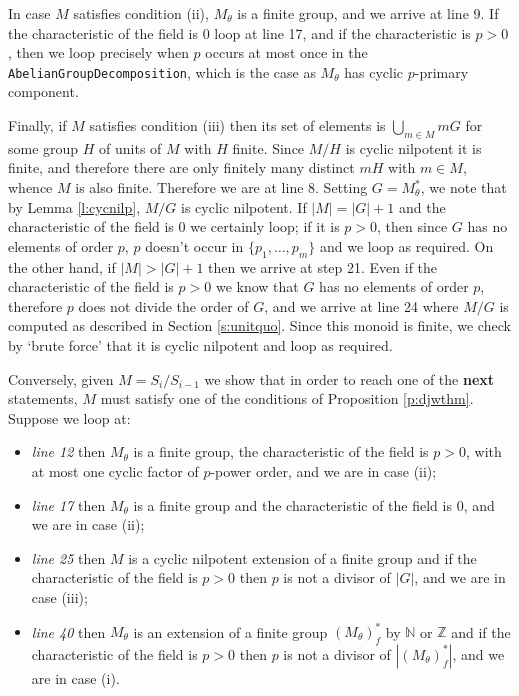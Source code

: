 \documentclass{acmconf}
\begin{document}
In case $M$ satisfies condition (ii), $M_\theta$ is a finite group,
and we arrive at line 9. If the characteristic of the field is 
$0$ loop at line 17, and if the characteristic is $p > 0$, then
we loop precisely when $p$ occurs at most once in 
the {\tt AbelianGroupDecomposition}, which is the case
as $M_\theta$ has cyclic $p$-primary component.

Finally, if $M$ satisfies condition (iii) then its set 
of elements is $\bigcup_{m \in M}mG$ for some group $H$  of units of $M$
with $H$ finite. Since $M/H$ is cyclic nilpotent it is finite, and
therefore there are only finitely many distinct $mH$ with $m \in M$, whence
$M$ is also finite. Therefore we are at line 8. Setting $G = M_\theta^*$,
we note that by Lemma \ref{l:cycnilp}, $M/G$ is cyclic nilpotent.
If $|M| = |G| + 1$ and the characteristic of the field is $0$ we certainly
loop; if it is $p >0$, then since $G$ has no elements of order $p$, 
$p$ doesn't occur in $\{p_1, \ldots, p_m\}$ and we loop as required. 
On the other hand, if  $|M| > |G| + 1$ then we arrive at step 21. 
Even if the characteristic of the field is $p > 0$ we know that
$G$ has no elements of order $p$, therefore $p$ does not divide the
order of $G$, and we arrive at line 24 where 
$M/G$ is computed as described in Section \ref{s:unitquo}.
Since this monoid is finite, we check by `brute force' that it is 
cyclic nilpotent and loop as required.

Conversely, given  $M = S_i/S_{i-1}$ we show that in order to
reach one of the {\bf next} statements, $M$ must satisfy one of the conditions
of Proposition  \ref{p:djwthm}. Suppose we loop at:
\begin{itemize}
\item \emph{line 12} then $M_\theta$ is a finite group, the characteristic
of the field is $p > 0$,  with at most one cyclic factor of $p$-power order,
and we are in case (ii);
\item \emph{line 17} then $M_\theta$ is a finite group and the characteristic
of the field is $0$, and we are in case (ii);
\item \emph{line 25} then $M$ is a cyclic nilpotent extension of a 
finite group and if the characteristic of
the field is $p > 0$ then $p$ is not a divisor of $|G|$, and we are in case
(iii);
\item \emph{line 40} then $M_\theta$ is an extension of a finite group 
$(M_\theta)^*_f$ by $\mathbb{N}$ or $\mathbb{Z}$ and if the 
characteristic of the field is $p > 0$ then $p$ is not a divisor 
of $|(M_\theta)^*_f|$, and  we are in case (i).
\end{itemize}
\end{document}
